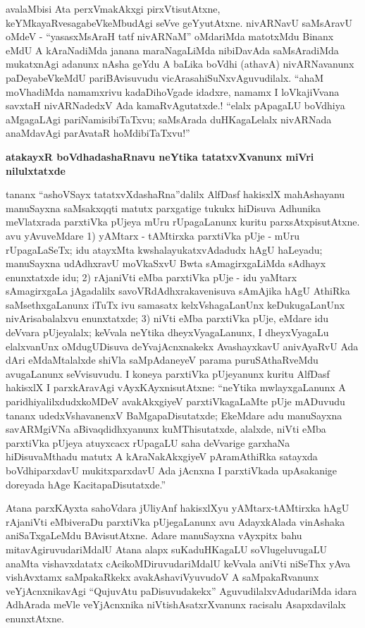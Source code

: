avalaMbisi Ata perxVmakAkxgi pirxVtisutAtxne, keYMkayaRvesagabeVkeMbudAgi seVve geYyutAtxne. nivARNavU saMsAravU oMdeV - ``yasasxMsAraH tatf \hbox{nivARNaM}'' oMdariMda matotxMdu Binanx eMdU A kAraNadiMda janana maraNagaLiMda nibiDavAda saMsAradiMda mukatxnAgi adanunx nAsha geYdu A baLika boVdhi (athavA) nivARNavanunx paDeyabeVkeMdU pariBAvisuvudu vicArasahiSuNxvAguvudilalx. ``ahaM moVhadiMda namamxrivu kadaDihoVgade idadxre, namamx I loVkajiVvana savxtaH nivARNadedxV Ada kamaR\-vAgutatxde.! ``elalx pApagaLU boVdhiya aMgagaLAgi pariNamisibiTaTxvu; saMsArada duHKagaLelalx nivARNada anaMdavAgi parAvataR hoMdibiTaTxvu!''

\bigskip
\begin{center}
{\Large\bf atakayxR boVdhadashaRnavu neYtika tatatxvXvanunx miVri nilulxtatxde}
\end{center}

tananx ``ashoVSayx tatatxvXdashaRna''dalilx AlfDasf hakisxlX mahAshayanu manuSayxna saMsakxqqti matutx parxgatige tukukx hiDisuva Adhunika meVlatxrada parxtiVka pUjeya mUru rUpagaLanunx kuritu parxsAtxpisutAtxne. avu yAvuveMdare {\rm 1)} yAMtarx - tAMtirxka parxtiVka pUje - mUru rUpagaLaSeTx; idu atayxMta kwshalayukatxvAdadudx hAgU haLeyadu; manuSayxna udAdhxravU moVkaSxvU Bwta sAmagirxgaLiMda sAdhayx enunxtatxde idu; {\rm 2)} rAjaniVti eMba parxtiVka pUje - idu yaMtarx sAmagirxgaLa jAgadalilx savoVRdAdhxrakavenisuva sAmAjika hAgU AthiRka saMsethxgaLanunx iTuTx ivu samasatx kelxVshagaLanUnx keDukugaLanUnx nivArisabalalxvu enunxtatxde; {\rm 3)} niVti eMba parxtiVka pUje, eMdare idu deVvara pUjeyalalx; keVvala neYtika dheyxVyagaLanunx, I dheyxVyagaLu elalxvanUnx oMdugUDisuva deYvajAcnxnakekx AvashayxkavU anivAyaRvU Ada dAri eMdaMtalalxde shiVla saMpAdaneyeV parama puruSAthaRveMdu avugaLanunx seVvisuvudu. I koneya parxtiVka pUjeyanunx kuritu AlfDasf hakisxlX I parxkAravAgi vAyxKAyxnisutAtxne: ``neYtika mwlayxgaLanunx A paridhiyalilxdudxkoMDeV avakAkxgiyeV parxtiVkagaLaMte pUje mADuvudu tananx udedxVshavanenxV BaMgapaDisutatxde; EkeMdare adu manuSayxna savARMgiVNa aBivaqdidhxyanunx kuMThisutatxde, alalxde, niVti eMba parxtiVka pUjeya atuyxcacx rUpagaLU saha deVvarige garxhaNa hiDisuvaMthadu matutx A kAraNakAkxgiyeV pAramAthiRka satayxda boVdhiparxdavU mukitxparxdavU Ada jAcnxna I parxtiVkada upAsakanige doreyada hAge KacitapaDisutatxde.''

Atana parxKAyxta sahoVdara jUliyAnf hakisxlXyu yAMtarx-tAMtirxka hAgU rAjaniVti eMbiveraDu parxtiVka pUjegaLanunx avu AdayxkAlada vinAshaka aniSaTxgaLeMdu BAvisutAtxne. Adare manuSayxna vAyxpitx bahu mitavAgiruvudariMdalU Atana alapx suKaduHKagaLU soVlugeluvugaLU anaMta vishavxdatatx cAcikoMDiruvudariMdalU keVvala aniVti niSeThx yAva vishAvxtamx saMpakaRkekx avakAshaviVyuvudoV A saMpakaRvanunx veYjAcnxnikavAgi ``QujuvAtu paDisuvudakekx'' AguvudilalxvAdudariMda idara AdhArada meVle veYjAcnxnika niVtishAsatxrXvanunx racisalu Asapxdavilalx enunxtAtxne.

